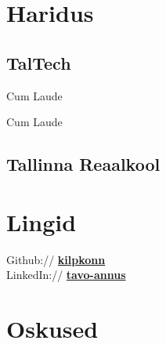 \documentclass[]{deedy-resume-openfont}
\begin{document}
\begin{minipage}[t]{0.33\textwidth} %


\section{Haridus} 

\subsection{TalTech}

Cum Laude \\

\sectionspace %

Cum Laude \\

\sectionspace %

\subsection{Tallinna Reaalkool}


\sectionspace %


\section{Lingid} 

Github:// \href{https://github.com/kilpkonn}{\bf kilpkonn} \\
LinkedIn:// \href{https://www.linkedin.com/in/tavo-annus-4a5631171/}{\bf tavo-annus} \\

\sectionspace %


\section{Oskused}


\end{minipage}
\end{document}
